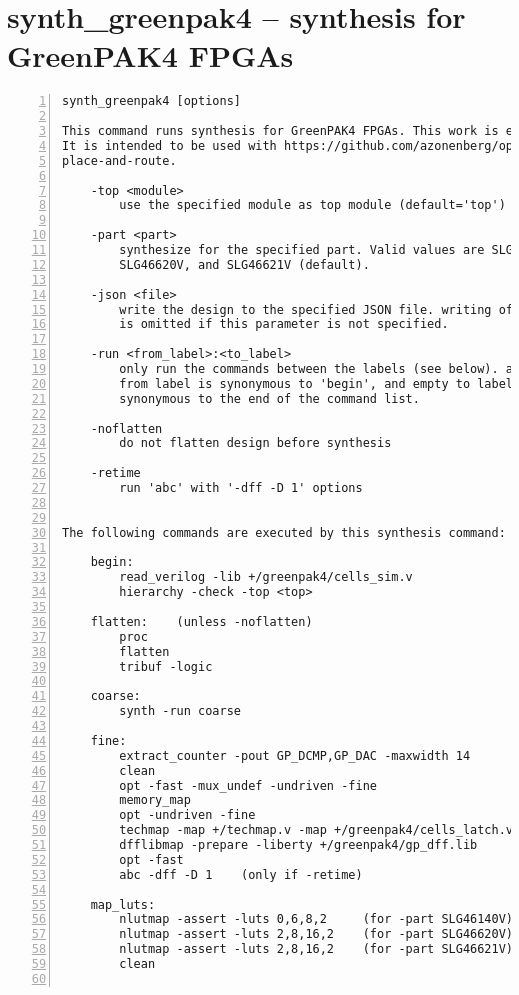 \section{synth\_greenpak4 -- synthesis for GreenPAK4 FPGAs}
\label{cmd:synth_greenpak4}
\begin{lstlisting}[numbers=left,frame=single]
    synth_greenpak4 [options]

This command runs synthesis for GreenPAK4 FPGAs. This work is experimental.
It is intended to be used with https://github.com/azonenberg/openfpga as the
place-and-route.

    -top <module>
        use the specified module as top module (default='top')

    -part <part>
        synthesize for the specified part. Valid values are SLG46140V,
        SLG46620V, and SLG46621V (default).

    -json <file>
        write the design to the specified JSON file. writing of an output file
        is omitted if this parameter is not specified.

    -run <from_label>:<to_label>
        only run the commands between the labels (see below). an empty
        from label is synonymous to 'begin', and empty to label is
        synonymous to the end of the command list.

    -noflatten
        do not flatten design before synthesis

    -retime
        run 'abc' with '-dff -D 1' options


The following commands are executed by this synthesis command:

    begin:
        read_verilog -lib +/greenpak4/cells_sim.v
        hierarchy -check -top <top>

    flatten:    (unless -noflatten)
        proc
        flatten
        tribuf -logic

    coarse:
        synth -run coarse

    fine:
        extract_counter -pout GP_DCMP,GP_DAC -maxwidth 14
        clean
        opt -fast -mux_undef -undriven -fine
        memory_map
        opt -undriven -fine
        techmap -map +/techmap.v -map +/greenpak4/cells_latch.v
        dfflibmap -prepare -liberty +/greenpak4/gp_dff.lib
        opt -fast
        abc -dff -D 1    (only if -retime)

    map_luts:
        nlutmap -assert -luts 0,6,8,2     (for -part SLG46140V)
        nlutmap -assert -luts 2,8,16,2    (for -part SLG46620V)
        nlutmap -assert -luts 2,8,16,2    (for -part SLG46621V)
        clean


\end{lstlisting}
